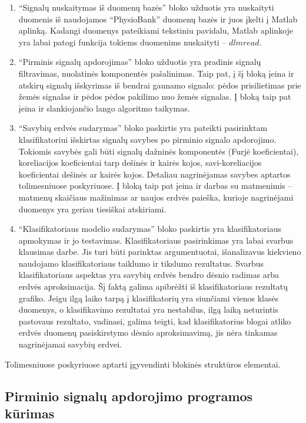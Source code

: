 \documentclass[]{vgtuef}
\begin{document}
\begin{enumerate}
\item ``Signalų nuskaitymas iš duomenų bazės'' bloko užduotis yra nuskaityti duomenis iš naudojamos ``PhysioBank'' duomenų bazės ir juos įkelti į Matlab aplinką. Kadangi duomenys pateikiami tekstiniu pavidalu, Matlab aplinkoje yra labai patogi funkcija tokiems duomenims nuskaityti -- $dlmread$.

\item ``Pirminis signalų apdorojimas'' bloko užduotis yra pradinis signalų filtravimas, nuolatinės komponentės pašalinimas. Taip pat, į šį bloką įeina ir atskirų signalų išskyrimas iš bendrai gaunamo signalo: pėdos prisilietimas prie žemės signalas ir pėdos pėdos pakilimo nuo žemės signalas. Į bloką taip pat įeina ir slankiojančio lango algoritmo taikymas.

\item ``Savybių erdvės sudarymas'' bloko paskirtis yra pateikti pasirinktam klasifikatoriui išskirtas signalų savybes po pirminio signalo apdorojimo. Tokiomis savybės gali būti signalų dažninės komponentės (Furjė koeficientai), koreliacijos koeficientai tarp dešinės ir kairės kojos, savi-koreliacijos koeficientai dešinės ar kairės kojos. Detaliau nagrinėjamas savybes aptartos tolimesniuose poskyriuose. Į bloką taip pat įeina ir darbas su matmenimis -- matmenų skaičiaus mažinimas ar naujos erdvės paieška, kurioje nagrinėjami duomenys yra geriau tiesiškai atskiriami.

\item ``Klasifikatoriaus modelio sudarymas'' bloko paskirtis yra klasifikatoriaus apmokymas ir jo testavimas. Klasifikatoriaus pasirinkimas yra labai svarbus klausimas darbe. Jis turi būti parinktas argumentuotai, išanalizavus kiekvieno naudojamo klasifikatoriaus taiklumo ir tikslumo rezultatus. Svarbus klasifikatoriaus aspektas yra savybių erdvės bendro dėsnio radimas arba erdvės aproksimacija. Šį faktą galima apibrėžti iš klasifikatoriaus rezultatų grafiko. Jeigu ilgą laiko tarpą į klasifikatorių yra siunčiami vienos klasės duomenys, o klasifikavimo rezultatai yra nestabilus, ilgą laiką neturintis pastovaus rezultato, vadinasi, galima teigti, kad klasifikatorius blogai atliko erdvės duomenų pasiskirstymo dėsnio aproksimavimą, jis nėra tinkamas nagrinėjamai savybių erdvei.
\end{enumerate}

Tolimesniuose poskyriuose aptarti įgyvendinti blokinės struktūros elementai.

\subsection{Pirminio signalų apdorojimo programos kūrimas}
\end{document}
